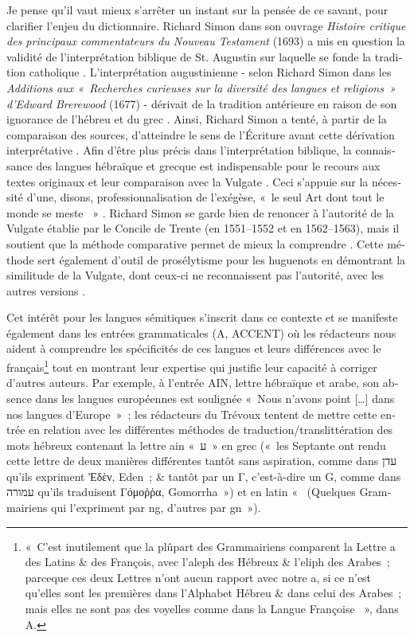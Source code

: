 \documentclass[output=paper,colorlinks,citecolor=brown,arabicfont,chinesefont,booklanguage=french]{langscibook}
\begin{document}
\begin{otherlanguage}{french}
Je pense qu’il vaut mieux s’arrêter un instant sur la pensée de ce savant, pour clarifier l’enjeu du dictionnaire. Richard Simon dans son ouvrage \emph{Histoire critique des principaux commentateurs du Nouveau Testament} (1693) a mis en question la validité de l’interprétation biblique de St. Augustin sur laquelle se fonde la tradition catholique \citep[255]{Tambrun2020}. L’interprétation augustinienne - selon Richard Simon dans les \emph{Additions aux «~Recherches curieuses sur la diversité des langues et religions~» d’Edward Brerewood} (1677) - dérivait de la tradition antérieure en raison de son ignorance de l’hébreu et du grec \citep[261]{Le-brun2012}. Ainsi, Richard Simon a tenté, à partir de la comparaison des sources, d’atteindre le sens de l’Écriture avant cette dérivation interprétative \citet[256]{Tambrun2020}. Afin d’être plus précis dans l’interprétation biblique, la connaissance des langues hébraïque et grecque est indispensable pour le recours aux textes originaux et leur comparaison avec la Vulgate \citep[6]{Simon1730}. Ceci s’appuie sur la nécessité d’une, disons, professionnalisation de l’exégèse, «~le seul Art dont tout le monde se meste  ~» \citep[3]{Simon1730}.  Richard Simon se garde bien de renoncer à l'autorité de la Vulgate établie par le Concile de Trente (en 1551--1552 et en 1562--1563), mais il soutient que la méthode comparative permet de mieux la comprendre \citet[4]{Simon1730}. Cette méthode sert également d’outil de prosélytisme pour les huguenots en démontrant la similitude de la Vulgate, dont ceux-ci ne reconnaissent pas l'autorité, avec les autres versions \citep[5]{Simon1730}.

Cet intérêt pour les langues sémitiques s’inscrit dans ce contexte et se manifeste également dans les entrées grammaticales (A, ACCENT) où les rédacteurs nous aident à comprendre les spécificités de ces langues et leurs différences avec le français\footnote{«~C’est inutilement que la plûpart des Grammairiens comparent la Lettre a des Latins \& des François, avec l’aleph des Hébreux \& l’eliph des Arabes~; parceque ces deux Lettres n’ont aucun rapport avec notre a, si ce n’est qu’elles sont les premières dans l’Alphabet Hébreu \& dans celui des Arabes~; mais elles ne sont pas des voyelles comme dans la Langue Françoise ~», dans A.} tout en montrant leur expertise qui justifie leur capacité à corriger d’autres auteurs. Par exemple, à l’entrée AIN, lettre hébraïque et arabe, son absence dans les langues européennes est soulignée «~Nous n’avons point […] dans nos langues d’Europe~»~; les rédacteurs du Trévoux tentent de mettre cette entrée en relation avec les différentes méthodes de traduction/translittération des mots hébreux contenant la lettre ain «~ע~»  en grec («~les Septante ont rendu cette lettre de deux manières différentes tantôt sans aspiration, comme dans עדן qu’ils expriment Ἐδὲν, Eden~; \& tantôt par un Γ, c’est-à-dire un G, comme dans עמורה qu’ils traduisent Γόμοῤῥα, Gomorrha~») et en latin «~ (Quelques Grammairiens qui l’expriment par ng, d’autres par gn~»).


\end{otherlanguage}
\end{document}
